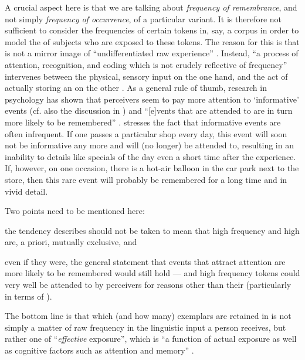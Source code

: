 A crucial aspect here is that we are talking about \emph{frequency of remembrance}, and not simply \emph{frequency of occurrence}, of a particular variant.
It is therefore not sufficient to consider the frequencies of certain tokens in, say, a corpus in order to model the  of subjects who are exposed to these tokens.
The reason for this is that  is not a mirror image of ``undifferentiated raw experience'' \parencite[525]{pierrehumbert2006}.
Instead, ``a process of attention, recognition, and coding which is not crudely reflective of frequency'' intervenes between the physical, sensory input on the one hand, and the act of actually storing an  on the other \parencite[525]{pierrehumbert2006}.
As a general rule of thumb, research in psychology has shown that perceivers seem to pay more attention to `informative' events (cf. also the discussion in \citealt{racz2013}) and ``[e]vents that are attended to are in turn more likely to be remembered'' \parencite[525]{pierrehumbert2006}.
\textcite[cf.][525]{pierrehumbert2006} stresses the fact that informative events are often infrequent.
If one passes a particular shop every day, this event will soon not be informative any more and will (no longer) be attended to, resulting in an inability to  details like specials of the day even a short time after the experience.
If, however, on one occasion, there is a hot-air balloon in the car park next to the store, then this rare event will probably be remembered for a long time and in vivid detail.

Two points need to be mentioned here:
\begin{inparaenum}[(1)]
	\item the tendency \citeauthor{pierrehumbert2006} describes should not be taken to mean that high frequency and high  are, a priori, mutually exclusive, and
	\item even if they were, the general statement that events that attract attention are more likely to be remembered would still hold --- and high frequency tokens could very well be attended to by perceivers for reasons other than their  (particularly in terms of ).
\end{inparaenum}
The bottom line is that which (and how many) exemplars are retained in  is not simply a matter of raw frequency in the linguistic input a person receives, but rather one of ``\emph{effective} exposure'', which is ``a function of actual exposure as well as cognitive factors such as attention and memory'' \parencite[519, my emphasis]{pierrehumbert2006}.

